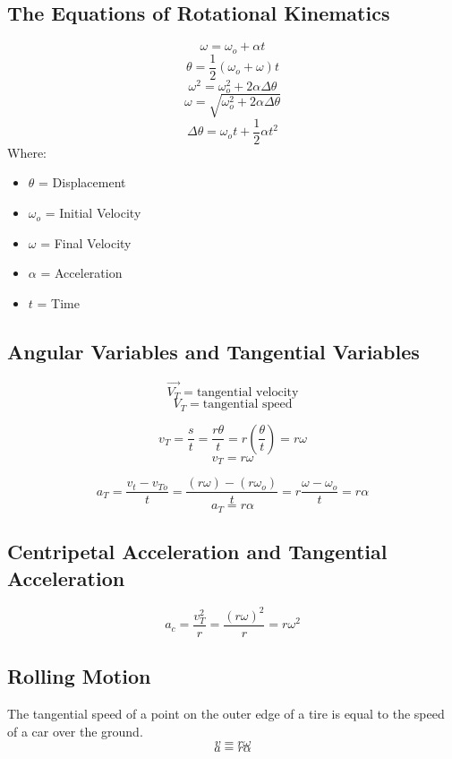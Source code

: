 \subsection{The Equations of Rotational Kinematics}
\[\omega=\omega_o+\alpha t\]
\[\theta=\frac{1}{2}(\omega_o+\omega)t\]
\[\omega^2=\omega^2_o+2\alpha \Delta\theta\]
\[\omega = \sqrt{\omega^2_o + 2 \alpha\Delta\theta}\]
\[\Delta \theta=\omega_o t+\frac{1}{2}\alpha t^2\]
Where: \begin{itemize}
	\item $\theta$ = Displacement
	\item $\omega_o$ = Initial Velocity
	\item $\omega$ = Final Velocity
	\item $\alpha$ = Acceleration
	\item $t$ = Time
\end{itemize}

\subsection{Angular Variables and Tangential Variables}
\[\overrightarrow{V_T} = \text{tangential velocity}\]
\[V_T = \text{tangential speed}\]

\[v_T=\frac{s}{t}=\frac{r\theta}{t}=r\left(\frac{\theta}{t}\right)=r\omega\]
\[v_T=r\omega\]

\[a_T=\frac{v_t-v_{To}}{t}=\frac{(r\omega)-(r\omega_o)}{t}=r\frac{\omega-\omega_o}{t}=r\alpha\]
\[a_T=r\alpha\]

\subsection{Centripetal Acceleration and Tangential Acceleration}
\[a_c=\frac{v^2_T}{r}=\frac{(r\omega)^2}{r}=r\omega^2\]

\subsection{Rolling Motion}
The tangential speed of a point on the outer edge of a tire is equal to the speed of a car over the ground. 
\[v=r\omega\]
\[a=r\alpha\]